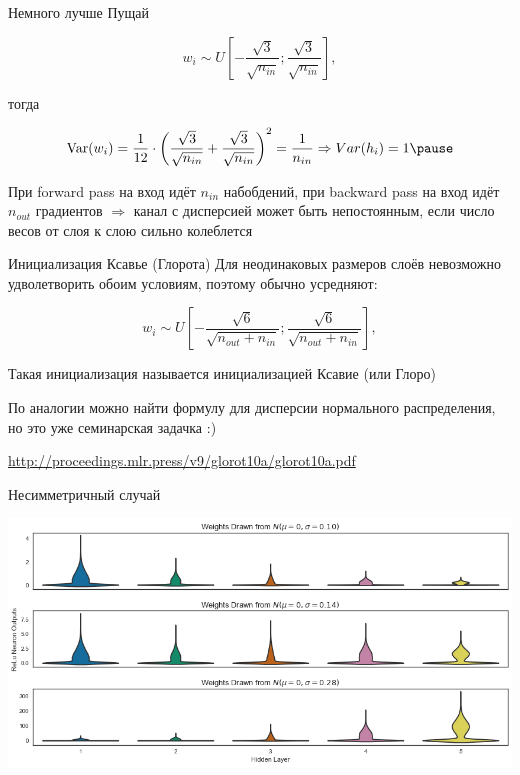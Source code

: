 \documentclass[notes,12pt, aspectratio=169]{beamer}
\DeclareMathOperator{\Var}{Var}
\begin{document}
\begin{frame}{Немного лучше}
	Пущай 
	
	$$ w_i \sim U \left[ - \frac{\sqrt{3}}{\sqrt{n_{in}}};  \frac{\sqrt{3}}{\sqrt{n_{in}}}  \right],$$
	
	тогда 
	
	$$
	\Var(w_i) = \frac{1}{12} \cdot \left( \frac{\sqrt{3}}{\sqrt{n_{in}}} + \frac{\sqrt{3}}{\sqrt{n_{in}}} \right)^2 = \frac{1}{n_{in}} \Rightarrow Var(h_i) = 1 \pause 
	$$
	
	\vfill 
	При forward pass на вход идёт $n_{in}$ набобдений, при backward pass на вход идёт $n_{out}$ градиентов $\Rightarrow$   \alert{канал с дисперсией может быть непостоянным, если число весов от слоя к слою сильно колеблется}
\end{frame}


\begin{frame}{Инициализация Ксавье (Глорота)}
Для неодинаковых размеров слоёв невозможно удволетворить обоим условиям, поэтому обычно усредняют: 

	$$ w_i \sim U \left[ - \frac{\sqrt{6}}{\sqrt{n_{out} + n_{in}}};  \frac{\sqrt{6}}{\sqrt{n_{out} + n_{in}}}  \right],$$

\vfill 

Такая инициализация называется \alert{инициализацией Ксавие (или Глоро)}

\vfill 

По аналогии можно найти формулу для дисперсии нормального распределения, но это уже семинарская задачка :)

\vfill %
\footnotesize
{\color{blue} \url{http://proceedings.mlr.press/v9/glorot10a/glorot10a.pdf}}
\end{frame}


\begin{frame}{Несимметричный случай}
\begin{center}
	\includegraphics[width=.9\linewidth]{init_relu.png}
\end{center}
\end{frame}
\end{document}
